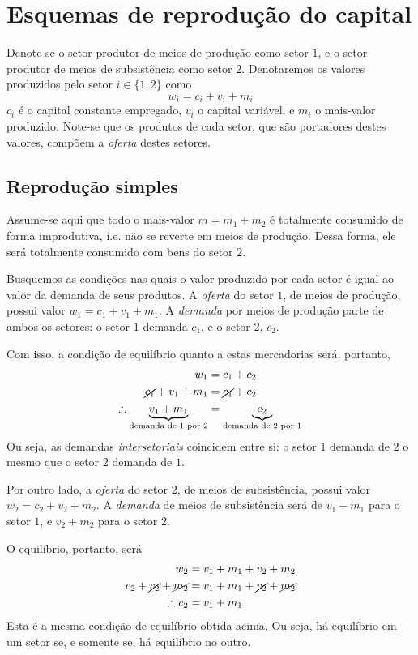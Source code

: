 \section{Esquemas de reprodução do capital}
Denote-se o setor produtor de meios de produção como setor $1$, e o setor produtor de meios de subsistência como setor $2$. Denotaremos os valores produzidos pelo setor $i\in \{1,2\}$ como 
$$
w_{i} = c_{i} + v_{i} + m_{i}
$$
$c_i$ é o capital constante empregado, $v_i$ o capital variável, e $m_i$ o mais-valor produzido. Note-se que os produtos de cada setor, que são portadores destes valores, compõem a \emph{oferta} destes setores.

\subsection{Reprodução simples}
Assume-se aqui que todo o mais-valor $m=m_1 + m_2$ é totalmente consumido de forma improdutiva, i.e. não se reverte em meios de produção. Dessa forma, ele será totalmente consumido com bens do setor $2$.

Busquemos as condições nas quais o valor produzido por cada setor é igual ao valor da demanda de seus produtos. A \textit{oferta} do setor $1$, de meios de produção, possui valor $w_{1} = c_{1} +v_{1}+m_{1}$. A \emph{demanda} por meios de produção parte de ambos os setores: o setor $1$ demanda $c_{1}$, e o setor $2$, $c_{2}$.

Com isso, a condição de equilíbrio quanto a estas mercadorias será, portanto, 
\begin{align*}
w_{1} &= c_{1} + c_{2} \\
\cancel{ c_{1} } + v_{1} + m_{1} &= \cancel{ c_{1} } + c_{2} \\
\therefore \underbrace{ v_{1} + m_{1} }_{ \text{demanda de 1 por 2} } &= \underbrace{ c_{2} }_{ \text{demanda de 2 por 1} }
\end{align*}
Ou seja, as demandas \textit{intersetoriais} coincidem entre si: o setor $1$ demanda de $2$ o mesmo que o setor $2$ demanda de $1$. 

Por outro lado, a \emph{oferta} do setor $2$, de meios de subsistência, possui valor $w_{2} = c_{2}+v_{2}+m_{2}$. A \emph{demanda} de meios de subsistência será de $v_{1}+m_{1}$ para o setor $1$, e $v_{2}+m_{2}$ para o setor $2$.

O equilíbrio, portanto, será 
\begin{align*}
w_{2} &= v_{1}+m_{1}+v_{2}+m_{2} \\
c_{2}+\cancel{ v_{2} }+\cancel{ m_{2} } &= v_{1} + m_{1} + \cancel{ v_{2} } + \cancel{ m_{2} } \\
\therefore c_{2} &= v_{1}+m_{1}
\end{align*}
Esta é a mesma condição de equilíbrio obtida acima. Ou seja, há equilíbrio em um setor se, e somente se, há equilíbrio no outro.


